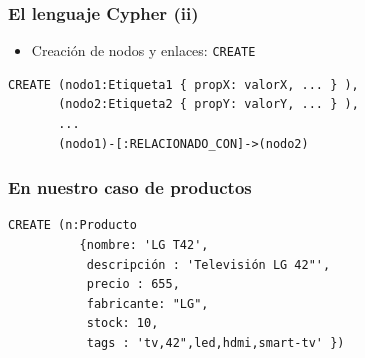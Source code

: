 \documentclass[14pt]{beamer}
\begin{document}
\begin{frame}[fragile]
  \frametitle{El lenguaje Cypher (ii)}
  \begin{itemize}
  \item Creación de nodos y enlaces: {\tt CREATE}
  \end{itemize}

\begin{lstlisting}[language=cypher]
CREATE (nodo1:Etiqueta1 { propX: valorX, ... } ),
       (nodo2:Etiqueta2 { propY: valorY, ... } ),
       ...
       (nodo1)-[:RELACIONADO_CON]->(nodo2)
\end{lstlisting}
\end{frame}

\begin{frame}[fragile]
  \frametitle{En nuestro caso de productos}
\begin{lstlisting}[language=cypher]
CREATE (n:Producto
          {nombre: 'LG T42',
           descripción : 'Televisión LG 42"',
           precio : 655,
           fabricante: "LG",
           stock: 10,
           tags : 'tv,42",led,hdmi,smart-tv' })
\end{lstlisting}
\end{frame}
\end{document}
